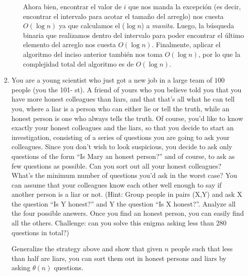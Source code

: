 \documentclass[letterpaper,11pt]{article}
\begin{document}
\begin{enumerate}
\begin{enumerate}
        Ahora bien, encontrar el valor de $i$ que nos manda la excepción (es 
        decir, encontrar el intervalo para acotar el tamaño del arreglo) nos 
        cuesta $O(\log n)$ ya que calculamos el ($\log n$) a \textit{manita}. 
        Luego, la búsqueda binaria que realizamos dentro del intervalo para 
        poder encontrar el último elemento del arreglo nos cuesta $O(\log n)$.
        Finalmente, aplicar el algoritmo del inciso anterior también nos toma 
        $O(\log n)$, por lo que la complejidad total del algoritmo es de 
        $O(\log n)$.
    \end{enumerate}
    
    \item You are a young scientist who just got a new job in a large team of 
    $100$ people (you the 101- st). A friend of yours who you believe told you 
    that you have more honest colleagues than liars, and that that’s all what 
    he can tell you, where a liar is a person who can either lie or tell the 
    truth, while an honest person is one who always tells the truth. Of course, 
    you’d like to know exactly your honest colleagues and the liars, so that 
    you decide to start an investigation, consisting of a series of questions 
    you are going to ask your colleagues. Since you don’t wish to look 
    suspicious, you decide to ask only questions of the form “Is Mary an honest 
    person?” and of course, to ask as few questions as possible. Can you sort 
    out all your honest colleagues? What’s the minimum number of questions you’d 
    ask in the worst case? You can assume that your colleagues know each other 
    well enough to say if another person is a liar or not. (Hint: Group people 
    in pairs (X,Y) and ask X the question “Is Y honest?” and Y the question 
    “Is X honest?”. Analyze all the four possible answers. Once you find an 
    honest person, you can easily find all the others. Challenge: can you solve 
    this enigma asking less than 280 questions in total?)
    
    Generalize the strategy above and show that given $n$ people such that less 
    than half are liars, you can sort them out in honest persons and liars by 
    asking $\theta(n)$ questions.


\end{enumerate}
\end{document}
